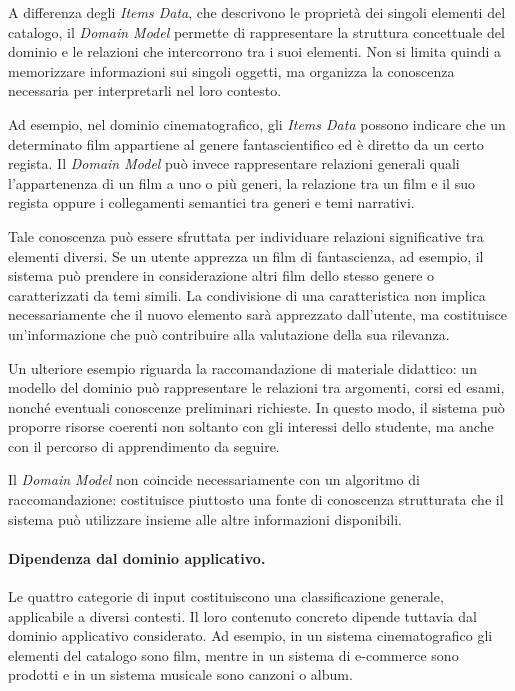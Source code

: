 A differenza degli \textit{Items Data}, che descrivono le proprietà
dei singoli elementi del catalogo, il \textit{Domain Model} permette
di rappresentare la struttura concettuale del dominio e le relazioni
che intercorrono tra i suoi elementi. Non si limita quindi a
memorizzare informazioni sui singoli oggetti, ma organizza la
conoscenza necessaria per interpretarli nel loro contesto.

Ad esempio, nel dominio cinematografico, gli \textit{Items Data}
possono indicare che un determinato film appartiene al genere
fantascientifico ed è diretto da un certo regista. Il
\textit{Domain Model} può invece rappresentare relazioni generali
quali l'appartenenza di un film a uno o più generi, la relazione
tra un film e il suo regista oppure i collegamenti semantici tra
generi e temi narrativi.

Tale conoscenza può essere sfruttata per individuare relazioni
significative tra elementi diversi. Se un utente apprezza un film
di fantascienza, ad esempio, il sistema può prendere in
considerazione altri film dello stesso genere o caratterizzati
da temi simili. La condivisione di una caratteristica non implica
necessariamente che il nuovo elemento sarà apprezzato dall'utente,
ma costituisce un'informazione che può contribuire alla
valutazione della sua rilevanza.

Un ulteriore esempio riguarda la raccomandazione di materiale
didattico: un modello del dominio può rappresentare le relazioni
tra argomenti, corsi ed esami, nonché eventuali conoscenze
preliminari richieste. In questo modo, il sistema può proporre
risorse coerenti non soltanto con gli interessi dello studente,
ma anche con il percorso di apprendimento da seguire.

Il \textit{Domain Model} non coincide necessariamente con un
algoritmo di raccomandazione: costituisce piuttosto una fonte
di conoscenza strutturata che il sistema può utilizzare insieme
alle altre informazioni disponibili.

\paragraph{Dipendenza dal dominio applicativo.}
Le quattro categorie di input costituiscono una classificazione
generale, applicabile a diversi contesti. Il loro contenuto
concreto dipende tuttavia dal dominio applicativo considerato.
Ad esempio, in un sistema cinematografico gli elementi del
catalogo sono film, mentre in un sistema di e-commerce sono
prodotti e in un sistema musicale sono canzoni o album.

